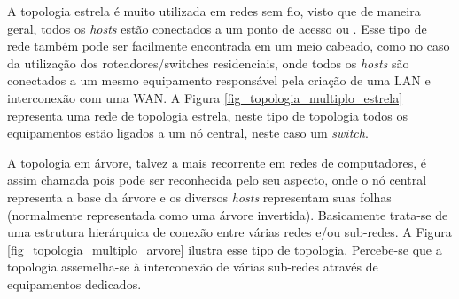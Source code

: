 
A topologia estrela é muito utilizada em redes sem fio, visto que de maneira geral, todos os \emph{hosts} estão conectados a um ponto de acesso ou . Esse tipo de rede também pode ser facilmente encontrada em um meio cabeado, como no caso da utilização dos roteadores/switches residenciais, onde todos os \emph{hosts} são conectados a um mesmo equipamento responsável pela criação de uma LAN e interconexão com uma WAN. A Figura \ref{fig_topologia_multiplo_estrela} representa uma rede de topologia estrela, neste tipo de topologia todos os equipamentos estão ligados a um nó central, neste caso um \emph{switch}.


A topologia em árvore, talvez a mais recorrente em redes de computadores, é assim chamada pois pode ser reconhecida pelo seu aspecto, onde o nó central representa a base da árvore e os diversos \emph{hosts} representam suas folhas (normalmente representada como uma árvore invertida). Basicamente trata-se de uma estrutura hierárquica de conexão entre várias redes e/ou sub-redes. A Figura \ref{fig_topologia_multiplo_arvore} ilustra esse tipo de topologia. Percebe-se que a topologia assemelha-se à interconexão de várias sub-redes através de equipamentos dedicados.


